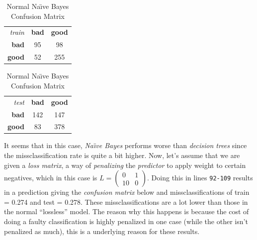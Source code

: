 \documentclass[a4paper, twocolumn]{article}
\begin{document}
        \begin{table}[h]
        \begin{center}
        \begin{tabular}{r|c|c|}
            \multicolumn{1}{r}{\emph{train}}
            &\multicolumn{1}{c}{\textbf{bad}}
            &\multicolumn{1}{c}{\textbf{good}} \\
            \cline{2-3}
            \textbf{bad} & 95 & 98 \\
            \cline{2-3}
            \textbf{good} & 52 & 255 \\
            \cline{2-3}
        \end{tabular}
        \begin{tabular}{r|c|c|}
            \multicolumn{1}{r}{\emph{test}}
            &\multicolumn{1}{c}{\textbf{bad}}
            &\multicolumn{1}{c}{\textbf{good}} \\
            \cline{2-3}
            \textbf{bad} & 142 & 147 \\
            \cline{2-3}
            \textbf{good} & 83 & 378 \\
            \cline{2-3}
        \end{tabular}
        \end{center}
        \caption{Normal Na{\"\i}ve Bayes Confusion Matrix}
        \label{table:bayes}
        \end{table}

        It seems that in this case, \emph{Na{\"\i}ve Bayes} performs worse than \emph{decision trees} since the missclassification rate is quite a bit higher. Now, let's assume that we are given a \emph{loss matrix}, a way of \emph{penalizing} the \emph{predictor} to apply weight to certain negatives, which in this case is $L = \left( \begin{smallmatrix}0&1\\10&0\end{smallmatrix} \right)$. Doing this in lines \texttt{92-109} results in a prediction giving the \emph{confusion matrix} below and missclassifications of train = 0.274 and test = 0.278. These missclassifications are a lot lower than those in the normal ``lossless'' model. The reason why this happens is because the cost of doing a faulty classification is highly penalized in one case (while the other isn't penalized as much), this is a underlying reason for these results.
\end{document}
